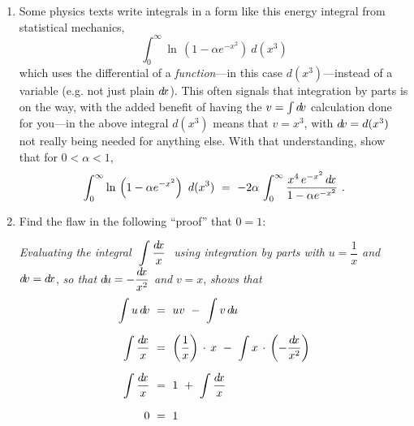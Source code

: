 {\begin{enumerate}[\bfseries 1.]
\[\]
where $k \approx 1.38056 \times 10^{-23}$ J/K is the Boltzmann constant. Show
that
\[
\avg{\nu} ~=~ \sqrt{\frac{8kT}{\pi m}} ~.
\]
 \item Some physics texts write integrals in a form like this energy integral
 from statistical mechanics,
\[
\int_0^{\infty} \ln\,\left(1 - \alpha e^{-x^2}\right)~d(x^3)
\]
which uses the differential of a \emph{function}---in this case
$d(x^3)$---instead of a variable (e.g. not just plain $d\!x$). This often
signals that integration by parts is on the way, with the added benefit of
having the $v=\int d\!v$ calculation done for you---in the above integral
$d(x^3)$ means that $v=x^3$, with $d\!v=d(x^3)$ not really being needed for
anything else. With that understanding, show that for $0 < \alpha  < 1$,
\[
\int_0^{\infty} \ln\,\left(1 - \alpha e^{-x^2}\right)~d(x^3) ~=~
-2\alpha\,\int_0^{\infty} \frac{x^4\,e^{-x^2}\,d\!x}{1 - \alpha e^{-x^2}} ~.
\]
 \item Find the flaw in the following ``proof'' that $0 = 1$:

\noindent\emph{Evaluating the integral}
$~\displaystyle\int \frac{d\!x}{x}~$ \emph{using integration by parts with}
$u = \dfrac{1}{x}$ \emph{and} $d\!v = d\!x$, \emph{so that} 
$d\!u = -\dfrac{d\!x}{x^2}$ \emph{and} $v = x$, 
\emph{shows that}
\begin{align*}
\int u\,d\!v ~&=~ uv ~-~ \int v\,d\!u\\[6pt]
\int \frac{d\!x}{x} ~&=~ \left(\frac{1}{x}\right) \,\cdot\,x ~-~ \int x \,\cdot\, \left(-\frac{d\!x}{x^2}\right)\\[6pt]
\int \frac{d\!x}{x} ~&=~ 1 ~+~ \int \frac{d\!x}{x}\\[6pt]
0 ~&=~ 1 \quad\relax
\end{align*}
\end{enumerate}
}
\newpage

